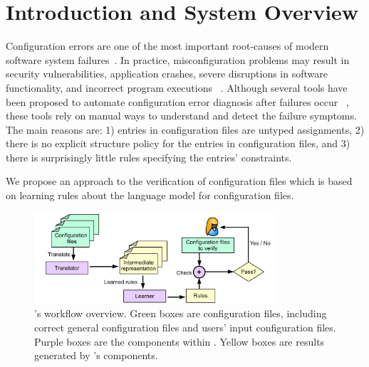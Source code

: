 \section{Introduction and System Overview}
\label{sec:Intro}

Configuration errors are one of the most important root-causes of 
modern software system failures~\cite{xu15systems,yin11anempirical}. 
In practice, misconfiguration problems may result in 
security vulnerabilities,
application crashes, severe disruptions in software functionality,
and incorrect program executions%
~\cite{xu15systems,zhang14encore,yuan11context}.
Although several tools have been proposed to automate configuration
error diagnosis after failures occur%
~\cite{wang04automatic,attariyan10automating,%
su07autobash,whitaker04configuration}, 
these tools rely on manual ways to understand and detect the failure 
symptoms. The main reasons are:
1) entries in configuration files are untyped assignments, 
2) there is no explicit structure policy for the entries in 
configuration files, and 3) there is surprisingly little rules 
specifying the entries' constraints.

We propose an approach to the verification of  
configuration files which is based on learning rules about the language 
model for configuration files. 

\begin{figure}[t] \centering
\includegraphics[width=0.8\textwidth]{figs/overview}
\caption{\app's workflow overview. Green boxes are configuration files,
  including correct general configuration files and users' input
  configuration files. Purple boxes are the components within \app.
  Yellow boxes are results generated by \app's components.}
\label{fig-overview}
\end{figure}

